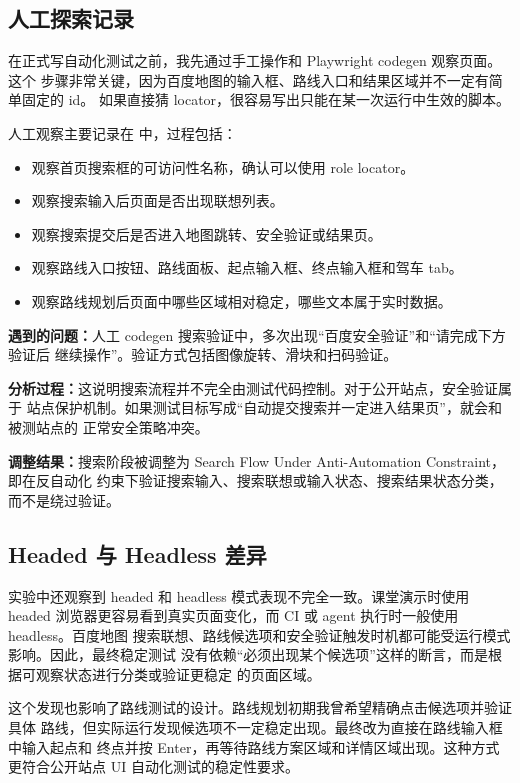 \documentclass[UTF8,a4paper,12pt]{ctexart}
\newcommand{\problem}[1]{\par\noindent\textbf{遇到的问题：}#1\par}
\newcommand{\analysis}[1]{\par\noindent\textbf{分析过程：}#1\par}
\newcommand{\fix}[1]{\par\noindent\textbf{调整结果：}#1\par}
\begin{document}
\subsection{人工探索记录}

在正式写自动化测试之前，我先通过手工操作和 Playwright codegen 观察页面。这个
步骤非常关键，因为百度地图的输入框、路线入口和结果区域并不一定有简单固定的 id。
如果直接猜 locator，很容易写出只能在某一次运行中生效的脚本。

人工观察主要记录在  中，过程包括：

\begin{itemize}
  \item 观察首页搜索框的可访问性名称，确认可以使用 role locator。
  \item 观察搜索输入后页面是否出现联想列表。
  \item 观察搜索提交后是否进入地图跳转、安全验证或结果页。
  \item 观察路线入口按钮、路线面板、起点输入框、终点输入框和驾车 tab。
  \item 观察路线规划后页面中哪些区域相对稳定，哪些文本属于实时数据。
\end{itemize}

\problem{人工 codegen 搜索验证中，多次出现“百度安全验证”和“请完成下方验证后
继续操作”。验证方式包括图像旋转、滑块和扫码验证。}

\analysis{这说明搜索流程并不完全由测试代码控制。对于公开站点，安全验证属于
站点保护机制。如果测试目标写成“自动提交搜索并一定进入结果页”，就会和被测站点的
正常安全策略冲突。}

\fix{搜索阶段被调整为 Search Flow Under Anti-Automation Constraint，即在反自动化
约束下验证搜索输入、搜索联想或输入状态、搜索结果状态分类，而不是绕过验证。}

\subsection{Headed 与 Headless 差异}

实验中还观察到 headed 和 headless 模式表现不完全一致。课堂演示时使用 headed
浏览器更容易看到真实页面变化，而 CI 或 agent 执行时一般使用 headless。百度地图
搜索联想、路线候选项和安全验证触发时机都可能受运行模式影响。因此，最终稳定测试
没有依赖“必须出现某个候选项”这样的断言，而是根据可观察状态进行分类或验证更稳定
的页面区域。

这个发现也影响了路线测试的设计。路线规划初期我曾希望精确点击候选项并验证具体
路线，但实际运行发现候选项不一定稳定出现。最终改为直接在路线输入框中输入起点和
终点并按 Enter，再等待路线方案区域和详情区域出现。这种方式更符合公开站点 UI
自动化测试的稳定性要求。
\end{document}

